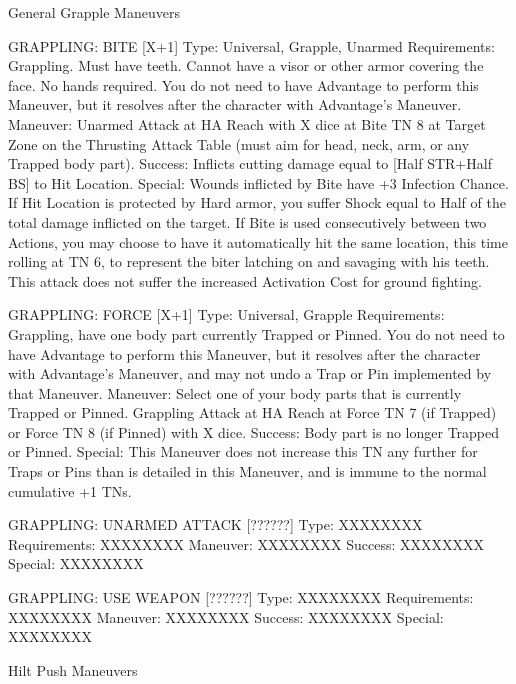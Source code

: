 \documentclass[oneside,11pt,english]{book}
\begin{document}
 

 


General Grapple Maneuvers 

 

GRAPPLING: BITE [X+1] 
Type: Universal, Grapple, Unarmed 
Requirements: Grappling. Must have teeth. Cannot have a visor or other armor covering the face. No 
hands required. You do not need to have Advantage to perform this Maneuver, but it resolves after the 
character with Advantage's Maneuver. 
Maneuver: Unarmed Attack at HA Reach with X dice at Bite TN 8 at Target Zone on the Thrusting 
Attack Table (must aim for head, neck, arm, or any Trapped body part). 
Success: Inflicts cutting damage equal to [Half STR+Half BS] to Hit Location. 
Special: Wounds inflicted by Bite have +3 Infection Chance. If Hit Location is protected by Hard armor, 
you suffer Shock equal to Half of the total damage inflicted on the target. 
If Bite is used consecutively between two Actions, you may choose to have it automatically hit the same 
location, this time rolling at TN 6, to represent the biter latching on and savaging with his teeth. 
This attack does not suffer the increased Activation Cost for ground fighting. 

 

GRAPPLING: FORCE [X+1] 
Type: Universal, Grapple 
Requirements: Grappling, have one body part currently Trapped or Pinned. You do not need to have 
Advantage to perform this Maneuver, but it resolves after the character with Advantage's Maneuver, and 
may not undo a Trap or Pin implemented by that Maneuver. 
Maneuver: Select one of your body parts that is currently Trapped or Pinned. Grappling Attack at HA 
Reach at Force TN 7 (if Trapped) or Force TN 8 (if Pinned) with X dice. 
Success: Body part is no longer Trapped or Pinned. 
Special: This Maneuver does not increase this TN any further for Traps or Pins than is detailed in this 
Maneuver, and is immune to the normal cumulative +1 TNs. 

 

GRAPPLING: UNARMED ATTACK [??????] 
Type: XXXXXXXX 
Requirements: XXXXXXXX 
Maneuver: XXXXXXXX 
Success: XXXXXXXX 
Special: XXXXXXXX 

 

GRAPPLING: USE WEAPON [??????] 
Type: XXXXXXXX 
Requirements: XXXXXXXX 
Maneuver: XXXXXXXX 
Success: XXXXXXXX 
Special: XXXXXXXX 

 

 

Hilt Push Maneuvers 
\end{document}
